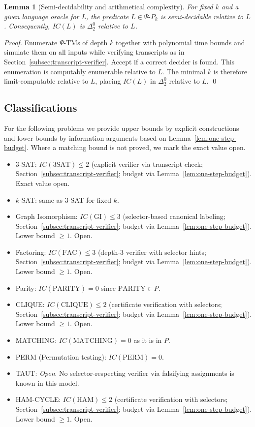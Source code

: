 \documentclass[11pt]{article}
\newtheorem{lemma}[theorem]{Lemma}
\theoremstyle{definition}
\newcommand{\PSi}{\Psi}
\begin{document}
\begin{lemma}[Semi-decidability and arithmetical complexity]
For fixed $k$ and a given language oracle for $L$, the predicate $L\in\Psi\text{-}P_k$ is semi-decidable relative to $L$. Consequently, $IC(L)$ is $\Delta^0_2$ relative to $L$.
\end{lemma}
\begin{proof}
Enumerate $\PSi$-TMs of depth $k$ together with polynomial time bounds and simulate them on all inputs while verifying transcripts as in Section~\ref{subsec:transcript-verifier}. Accept if a correct decider is found. This enumeration is computably enumerable relative to $L$. The minimal $k$ is therefore limit-computable relative to $L$, placing $IC(L)$ in $\Delta^0_2$ relative to $L$. \qed
\end{proof}

\subsection{Classifications}

For the following problems we provide upper bounds by explicit constructions and lower bounds by information arguments based on Lemma~\ref{lem:one-step-budget}. Where a matching bound is not proved, we mark the exact value open.

\begin{itemize}
\item 3-SAT: $IC(\mathrm{3SAT})\le 2$ (explicit verifier via transcript check; Section~\ref{subsec:transcript-verifier}; budget via Lemma~\ref{lem:one-step-budget}). Exact value open.
  \item $k$-SAT: same as 3-SAT for fixed $k$.
\item Graph Isomorphism: $IC(\mathrm{GI})\le 3$ (selector-based canonical labeling; Section~\ref{subsec:transcript-verifier}; budget via Lemma~\ref{lem:one-step-budget}). Lower bound $\ge1$. Open.
\item Factoring: $IC(\mathrm{FAC})\le 3$ (depth-3 verifier with selector hints; Section~\ref{subsec:transcript-verifier}; budget via Lemma~\ref{lem:one-step-budget}). Lower bound $\ge1$. Open.
  \item Parity: $IC(\mathrm{PARITY})=0$ since $\mathrm{PARITY}\in P$.
\item CLIQUE: $IC(\mathrm{CLIQUE})\le 2$ (certificate verification with selectors; Section~\ref{subsec:transcript-verifier}; budget via Lemma~\ref{lem:one-step-budget}). Lower bound $\ge1$. Open.
  \item MATCHING: $IC(\mathrm{MATCHING})=0$ as it is in $P$.
  \item PERM (Permutation testing): $IC(\mathrm{PERM})=0$.
  \item TAUT: \emph{Open}. No selector-respecting verifier via falsifying assignments is known in this model.
\item HAM-CYCLE: $IC(\mathrm{HAM})\le 2$ (certificate verification with selectors; Section~\ref{subsec:transcript-verifier}; budget via Lemma~\ref{lem:one-step-budget}). Lower bound $\ge1$. Open.
\end{itemize}
\end{document}
